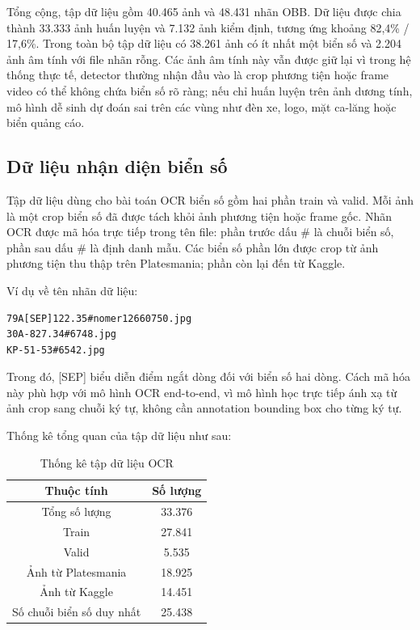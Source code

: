 \documentclass[../DoAn.tex]{subfiles}
\begin{document}
Tổng cộng, tập dữ liệu gồm 40.465 ảnh và 48.431 nhãn OBB. Dữ liệu được chia thành 33.333 ảnh huấn luyện và 7.132 ảnh kiểm định, tương ứng khoảng 82,4\% / 17,6\%. Trong toàn bộ tập dữ liệu có 38.261 ảnh có ít nhất một biển số và 2.204 ảnh âm tính với file nhãn rỗng. Các ảnh âm tính này vẫn được giữ lại vì trong hệ thống thực tế, detector thường nhận đầu vào là crop phương tiện hoặc frame video có thể không chứa biển số rõ ràng; nếu chỉ huấn luyện trên ảnh dương tính, mô hình dễ sinh dự đoán sai trên các vùng như đèn xe, logo, mặt ca-lăng hoặc biển quảng cáo.

\subsection{Dữ liệu nhận diện biển số}
\label{subsection:4.data.2}
Tập dữ liệu dùng cho bài toán OCR biển số gồm hai phần train và valid. Mỗi ảnh là một crop biển số đã được tách khỏi ảnh phương tiện hoặc frame gốc. Nhãn OCR được mã hóa trực tiếp trong tên file: phần trước dấu \# là chuỗi biển số, phần sau dấu \# là định danh mẫu. Các biển số phần lớn được crop từ ảnh phương tiện thu thập trên Platesmania; phần còn lại đến từ Kaggle.

Ví dụ về tên nhãn dữ liệu:

\begin{verbatim}
79A[SEP]122.35#nomer12660750.jpg
30A-827.34#6748.jpg
KP-51-53#6542.jpg
\end{verbatim}

Trong đó, [SEP] biểu diễn điểm ngắt dòng đối với biển số hai dòng. Cách mã hóa này phù hợp với mô hình OCR end-to-end, vì mô hình học trực tiếp ánh xạ từ ảnh crop sang chuỗi ký tự, không cần annotation bounding box cho từng ký tự.

Thống kê tổng quan của tập dữ liệu như sau:
\begin{table}[htbp]
\centering
\caption{Thống kê tập dữ liệu OCR}

\begin{tabular}{|c|c|}
\hline
Thuộc tính & Số lượng \\
\hline
Tổng số lượng & 33.376 \\
Train & 27.841 \\
Valid & 5.535 \\
Ảnh từ Platesmania & 18.925 \\
Ảnh từ Kaggle & 14.451 \\
Số chuỗi biển số duy nhất & 25.438 \\
\hline
\end{tabular}
\end{table}
\end{document}

